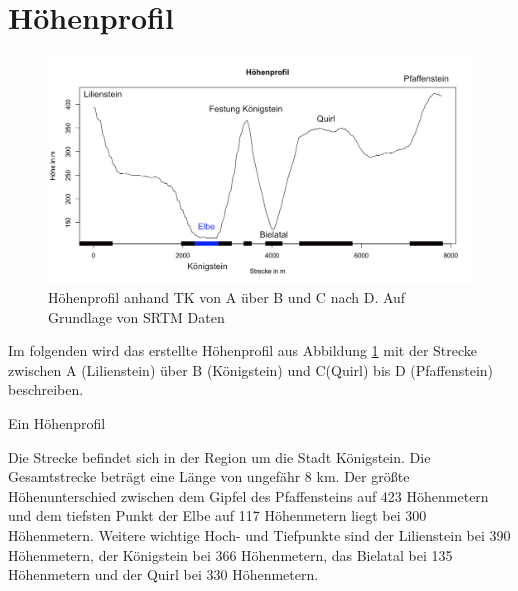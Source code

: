 \section{Höhenprofil}

\begin{figure}[h]
    \centering
    \includegraphics[scale = 0.40]{Abbildungen/Hoehenprofil.jpg}
    \caption{Höhenprofil anhand TK von A über B und C nach D. Auf Grundlage von SRTM Daten}
    \label{fig:abb2}
\end{figure}

Im folgenden wird das erstellte Höhenprofil aus Abbildung \ref{fig:abb2} mit der Strecke zwischen A (Lilienstein) über B (Königstein) und C(Quirl) bis D (Pfaffenstein) beschreiben. 

Ein Höhenprofil 

Die Strecke befindet sich in der Region um die Stadt Königstein. Die Gesamtstrecke beträgt eine Länge von ungefähr 8 km. Der größte Höhenunterschied zwischen dem Gipfel des Pfaffensteins auf 423 Höhenmetern und dem tiefsten Punkt der Elbe auf 117 Höhenmetern liegt bei 300 Höhenmetern. Weitere wichtige Hoch- und Tiefpunkte sind der Lilienstein bei 390 Höhenmetern, der Königstein bei 366 Höhenmetern, das Bielatal bei 135 Höhenmetern und der Quirl bei 330 Höhenmetern. 

